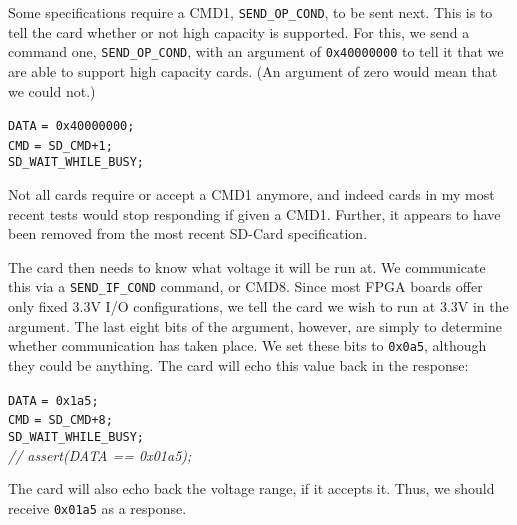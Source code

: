 \documentclass{gqtekspec}
\begin{document}
Some specifications require a CMD1, \hbox{\tt SEND\_OP\_COND}, to be
sent next.  This is to tell the card whether or not high capacity is supported.
For this, we send a command one,
\hbox{\tt SEND\_OP\_COND}, with an argument of {\tt 0x40000000} to tell it
that we are able to support high capacity cards.  (An argument of zero would
mean that we could not.)
\begin{tabbing}
{\tt DATA} \= {\tt = 0x40000000;} \\
{\tt CMD} \> {\tt = SD\_CMD+1;} \\
{\tt SD\_WAIT\_WHILE\_BUSY;}
\end{tabbing}

Not all cards require or accept a CMD1 anymore, and indeed cards in my most
recent tests would stop responding if given a CMD1.  Further, it appears to have
been removed from the most recent SD-Card specification.

The card then needs to know what voltage it will be run at.  We communicate this
via a \hbox{\tt SEND\_IF\_COND} command, or CMD8.  Since most FPGA boards offer
only fixed 3.3V I/O configurations, we tell the card we wish to run at 3.3V in
the argument.  The last eight bits of the argument, however, are simply to
determine whether communication has taken place.  We set these bits to
{\tt 0x0a5}, although they could be anything.  The card will echo this value
back in the response:
\begin{tabbing}
{\tt DATA} \= {\tt = 0x1a5;} \\
{\tt CMD} \> {\tt = SD\_CMD+8;} \\
{\tt SD\_WAIT\_WHILE\_BUSY;} \\
{\em // assert(DATA == 0x01a5);}
\end{tabbing}
The card will also echo back the voltage range, if it accepts it.  Thus,
we should receive {\tt 0x01a5} as a response.
\end{document}
